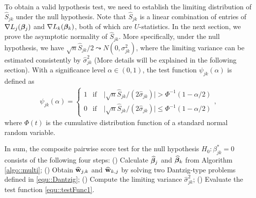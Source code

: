 \documentclass[twoside,11pt]{article}
\newcommand*{\hbbeta}{\hat{\bbeta}}
\newcommand{\rmnum}[1]{\romannumeral #1}
\newcommand*{\hw}{\hat{\wb}}
\begin{document}



To obtain a valid hypothesis test, we  need to establish   the limiting distribution of $\hat{S}_{jk}$ under the null hypothesis. Note that $\hat{S}_{jk}$ is a linear combination of entries of $\nabla{L_j}(\bm{\beta}_j)$ and $\nabla L_k(\bm{\beta}_k)$, both of which are $U$-statistics. In the next section, we prove  the asymptotic normality of $\hat{S}_{jk}$.   More specifically, under the null hypothesis, we have $\sqrt{n} \hat{S}_{jk} /2\leadsto N(0,\sigma_{jk}^2)$,  where the limiting variance can be estimated consistently by $\hat{\sigma}_{jk}^2$  (More details will be explained in the following  section). With a  significance level $\alpha\in(0,1)$, the test function  $\psi_{jk}(\alpha)$  is defined as 
\begin{align}\label{equ::testFunc1}
\psi_{jk}(\alpha) = 
\begin{cases}
1 &\text{if}\quad \bigl |  \sqrt{n} \hat{S}_{jk} \big/(2\hat{\sigma}_{jk})\bigr|  > \Phi^{-1}(1- \alpha/2)\\
0 & \text{if} \quad\bigl |  \sqrt{n} \hat{S}_{jk}\big /(2\hat{\sigma}_{jk})\bigr| \leq \Phi^{-1}(1- \alpha/2)
\end{cases},
\end{align}
where $\Phi(t)$ is the cumulative  distribution function of a standard normal random variable.

In sum, the composite pairwise score test for the null hypothesis $H_0\colon \beta_{jk}^* = 0$ consists of the  following four steps: 
(\rmnum{1}) Calculate $\hbbeta_j$ and $\hbbeta_k$ from Algorithm \ref{algo::multi};
(\rmnum{2}) Obtain $\hw_{j,k}$ and $\hw_{k , j}$ by solving two Dantzig-type problems defined in  \eqref{equ::Dantzig};
(\rmnum{3}) Compute the limiting variance $\hat \sigma_{jk}^2$;
(\rmnum{4})  Evaluate the test function \eqref{equ::testFunc1}.




\end{document}
